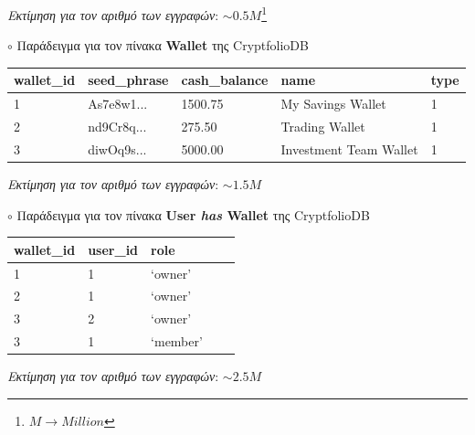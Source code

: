 \documentclass[a4paper,12pt]{article}
\begin{document}
\begin{flushright}
\textit{Εκτίμηση για τον αριθμό των εγγραφών}: $\sim0.5M$\footnote{$M \xrightarrow{} Million$}
\end{flushright}



\bigskip
\noindent $\circ$ Παράδειγμα για τον πίνακα \textbf{Wallet} της CryptfolioDB


\noindent \begin{tabular}{|l|l|l|l|l|}
    \hline
    \textbf{wallet\_id} & \textbf{seed\_phrase} & \textbf{cash\_balance} & \textbf{name} & \textbf{type} \\
    \hline
    1 & As7e8w1... & 1500.75 & My Savings Wallet & 1 \\
    \hline
    2 & nd9Cr8q... & 275.50 & Trading Wallet & 1 \\
    \hline
    3 & diwOq9s... & 5000.00 & Investment Team Wallet & 1 \\
    \hline
\end{tabular}

\begin{flushright}
\textit{Εκτίμηση για τον αριθμό των εγγραφών}: $\sim1.5M$
\end{flushright}


\bigskip
\noindent $\circ$ Παράδειγμα για τον πίνακα \textbf{User \textit{has} Wallet} της CryptfolioDB


\noindent \begin{tabular}{|l|l|l|l|l|}
    \hline
    \textbf{wallet\_id} & \textbf{user\_id} & \textbf{role} \\
    \hline
    1 & 1 & `owner' \\
    \hline
    2 & 1 & `owner' \\
    \hline
    3 & 2 & `owner' \\
    \hline
    3 & 1 & `member' \\
    \hline
\end{tabular}

\begin{flushright}
\textit{Εκτίμηση για τον αριθμό των εγγραφών}: $\sim2.5M$
\end{flushright}
\end{document}
